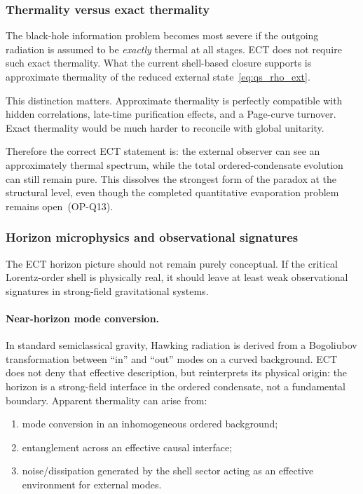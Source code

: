\subsubsection*{Thermality versus exact thermality}

The black-hole information problem becomes most severe if the outgoing
radiation is assumed to be \emph{exactly} thermal at all stages.
ECT does not require such exact thermality.
What the current shell-based closure supports is approximate thermality
of the reduced external state~\eqref{eq:qs_rho_ext}.

This distinction matters.
Approximate thermality is perfectly compatible with hidden correlations,
late-time purification effects, and a Page-curve turnover.
Exact thermality would be much harder to reconcile with global unitarity.

Therefore the correct ECT statement is: the external observer can see an
approximately thermal spectrum, while the total ordered-condensate
evolution can still remain pure.
This dissolves the strongest form of the paradox at the structural level,
even though the completed quantitative evaporation problem remains
open~(OP-Q13).

\subsubsection*{Horizon microphysics and observational signatures}

The ECT horizon picture should not remain purely conceptual.
If the critical Lorentz-order shell is physically real, it should leave
at least weak observational signatures in strong-field gravitational
systems.

\paragraph{Near-horizon mode conversion.}
In standard semiclassical gravity, Hawking radiation is derived from a
Bogoliubov transformation between ``in'' and ``out'' modes on a curved
background.
ECT does not deny that effective description, but reinterprets its
physical origin: the horizon is a strong-field interface in the ordered
condensate, not a fundamental boundary.
Apparent thermality can arise from:
\begin{enumerate}[label=(\roman*)]
  \item mode conversion in an inhomogeneous ordered background;
  \item entanglement across an effective causal interface;
  \item noise/dissipation generated by the shell sector acting as an
    effective environment for external modes.
\end{enumerate}


